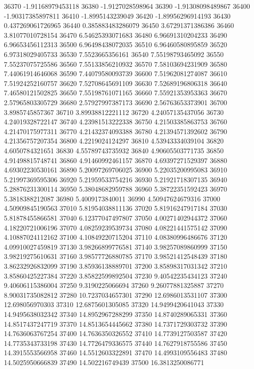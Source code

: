 {36370 -1.91168979453118
36380 -1.9127028598964
36390 -1.91308098489867
36400 -1.90317385897811
36410 -1.8995143239049
36420 -1.89956296914193
36430 0.437269061726965
36440 0.385883483286079
36450 3.67291371386386
36460 3.81077010728154
36470 6.54625393071683
36480 6.96691310204233
36490 6.96653456112313
36500 6.96498438072035
36510 6.96460580895859
36520 6.97318029405733
36530 7.5523665356161
36540 7.55198793465092
36550 7.55237075725586
36560 7.55133856210932
36570 7.58103694231909
36580 7.44061914646068
36590 7.44079580093739
36600 7.51962081274087
36610 7.51924252160757
36620 7.52708645691109
36630 7.52689196806318
36640 7.46580121502825
36650 7.55198761071165
36660 7.55921353953363
36670 2.57965803305729
36680 2.57927997387173
36690 2.56763653373901
36700 3.8985745857367
36710 3.89938812221112
36720 4.24057135437056
36730 4.24019328722147
36740 4.23981513222338
36750 4.21503385863753
36760 4.21470175977311
36770 4.21432374093388
36780 4.21394571392602
36790 4.21356757207354
36800 4.2219024124297
36810 4.53943334039104
36820 4.6050784321651
36830 4.55789743735932
36840 4.90605503771735
36850 4.91498815748741
36860 4.91460992461157
36870 4.69397271529397
36880 4.69302230530161
36890 5.20097269706025
36900 5.22035200995083
36910 5.21997369595306
36920 5.21959533754216
36930 5.21921718307135
36940 5.28876231300114
36950 5.38048682959788
36960 5.38722351592423
36970 5.3818388212087
36980 5.4009173840011
36990 4.50947624679316
37000 4.50909845190563
37010 5.81954038811136
37020 5.81916247917184
37030 5.81878455866581
37040 6.12377047497807
37050 4.00271402944372
37060 4.18220721006196
37070 4.08259239539734
37080 4.08221441575142
37090 4.10887024112162
37100 4.10849220715204
37110 4.08380996486676
37120 4.09910027459819
37130 3.98266899776581
37140 3.98257089860999
37150 3.98219275610631
37160 3.98577726880785
37170 3.98521412548439
37180 3.86232926832099
37190 3.85936138889701
37200 3.85898317031342
37210 3.85860425227384
37220 3.85822599892504
37230 9.40542235434123
37240 9.40606115386004
37250 9.3190225066694
37260 9.26077881325887
37270 8.90031735082812
37280 10.7237034657301
37290 12.6986013531107
37300 12.698056970303
37310 12.6875601305085
37320 14.9499420641043
37330 14.9495638032342
37340 14.8952967288299
37350 14.8740289065331
37360 14.8517437247719
37370 14.8513654445662
37380 14.7371729303732
37390 14.7636063767254
37400 14.7636350326552
37410 14.7739127503587
37420 14.7735343733198
37430 14.7726479336575
37440 14.7627918755586
37450 14.3915553566958
37460 14.5512603322891
37470 14.4993109556483
37480 14.5025950666839
37490 14.502216749439
37500 16.3813250086771
}

